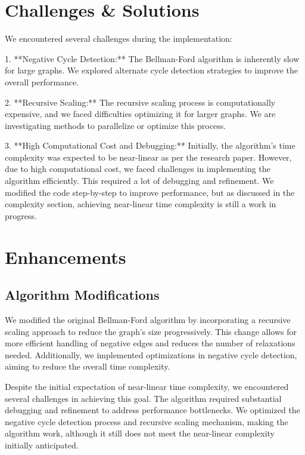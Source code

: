 \documentclass{article}
\begin{document}
\section{Challenges \& Solutions}
\label{sec:challenges_solutions}
We encountered several challenges during the implementation:

1. **Negative Cycle Detection:** The Bellman-Ford algorithm is inherently slow for large graphs. We explored alternate cycle detection strategies to improve the overall performance.
   
2. **Recursive Scaling:** The recursive scaling process is computationally expensive, and we faced difficulties optimizing it for larger graphs. We are investigating methods to parallelize or optimize this process.

3. **High Computational Cost and Debugging:** Initially, the algorithm's time complexity was expected to be near-linear as per the research paper. However, due to high computational cost, we faced challenges in implementing the algorithm efficiently. This required a lot of debugging and refinement. We modified the code step-by-step to improve performance, but as discussed in the complexity section, achieving near-linear time complexity is still a work in progress.

\section{Enhancements}
\label{sec:enhancements}
\subsection{Algorithm Modifications}
\label{subsec:algorithm_modifications}
We modified the original Bellman-Ford algorithm by incorporating a recursive scaling approach to reduce the graph’s size progressively. This change allows for more efficient handling of negative edges and reduces the number of relaxations needed. Additionally, we implemented optimizations in negative cycle detection, aiming to reduce the overall time complexity.

Despite the initial expectation of near-linear time complexity, we encountered several challenges in achieving this goal. The algorithm required substantial debugging and refinement to address performance bottlenecks. We optimized the negative cycle detection process and recursive scaling mechanism, making the algorithm work, although it still does not meet the near-linear complexity initially anticipated.
\end{document}
